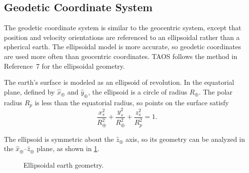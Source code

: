 \subsection{Geodetic Coordinate System}\label{sec:geodetic}

The geodetic coordinate system is similar to the geocentric system, except that
position and velocity orientations are referenced to an ellipsoidal rather than a
spherical earth. The ellipsoidal model is more accurate, so geodetic coordinates are
used more often than geocentric coordinates. TAOS follows the method in
Reference~7 for the ellipsoidal geometry.

The earth's surface is modeled as an ellipsoid of revolution. In the equatorial plane,
defined by $\hat{x}_{\oplus}$ and $\hat{y}_{\oplus}$, the ellipsoid is a circle of
radius $R_{\oplus}$. The polar radius $R_p$ is less than the equatorial radius, so
points on the surface satisfy
\begin{equation}
  \frac{x_s^2}{R_{\oplus}^2}
  +\frac{y_s^2}{R_{\oplus}^2}
  +\frac{z_s^2}{R_p^2}=1.
  \label{eq:ellipsoid-surface}
\end{equation}

The ellipsoid is symmetric about the $\hat{z}_{\oplus}$ axis, so its geometry can be
analyzed in the $\hat{x}_{\oplus}$--$\hat{z}_{\oplus}$ plane, as shown in
\cref{fig:ellipsoidal-earth-geometry}.

\begin{figure}[htbp]
  \centering
  \resizebox{0.75\linewidth}{!}{}
  \caption{Ellipsoidal earth geometry.}
  \label{fig:ellipsoidal-earth-geometry}
\end{figure}

